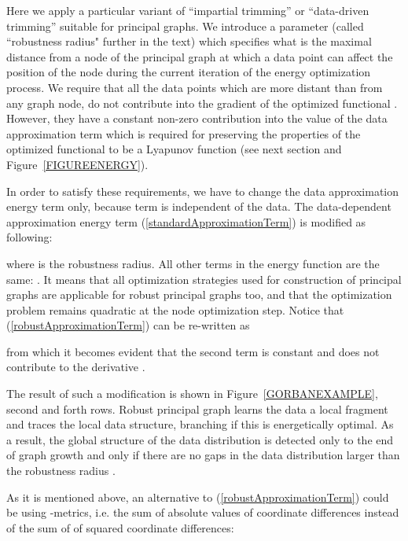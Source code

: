 \documentclass[graybox]{archivesofdatascience}
\begin{document}
Here we apply a particular variant of ``impartial trimming'' \citep{gordaliza1991best} or ``data-driven trimming'' suitable for principal graphs.
We introduce a parameter  (called ``robustness radius" further in the text) which specifies what is the maximal
distance from a node of the principal graph at which a data point can affect the position of the node during the current iteration of the energy optimization process.
We require that all the data points which are more distant than  from any graph node, do not contribute into the gradient of the optimized functional .
However, they have a constant non-zero contribution  into the value of the data approximation term which is required for preserving the properties of the
optimized functional  to be a Lyapunov function (see next section and Figure~\ref{FIGUREENERGY}).

In order to satisfy these requirements, we have to change the data approximation energy term only, because  term is independent of the data. The data-dependent approximation energy term (\ref{standardApproximationTerm}) is modified as following:



\noindent where  is the robustness radius. All other terms in the energy function are the same: . 
It means that all optimization strategies used for construction of principal graphs are applicable for robust principal graphs too,
and that the optimization problem remains quadratic at the node optimization step. Notice that (\ref{robustApproximationTerm}) can be re-written as



\noindent from which it becomes evident that the second term is constant and does not contribute to the derivative .




The result of such a modification is shown in Figure~\ref{GORBANEXAMPLE}, second and forth rows. Robust principal graph learns the data a local fragment and traces the local data structure, branching if this is energetically optimal. As a result, the global structure of the data distribution is detected only to the end of graph growth and only if there are no gaps in the data distribution larger than the robustness radius .





\iffalse

As it is mentioned above, an alternative to (\ref{robustApproximationTerm}) could be using -metrics, i.e. the sum of absolute values of coordinate differences instead of the sum of of squared coordinate differences:
\end{document}
